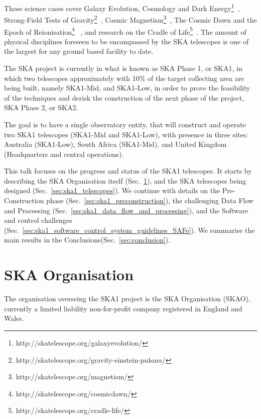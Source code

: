 \documentclass[a4paper,
               biblatex,       %
               keeplastbox,    %
               ]{jacow-2_1}    %
\begin{document}
Those science cases cover Galaxy Evolution, Cosmology and Dark Energy\footnote{http://skatelescope.org/galaxyevolution/}~\cite{2015aska.confE..67P, 2015aska.confE..16M, 2015aska.confE..51F}, Strong-Field Tests of Gravity\footnote{http://skatelescope.org/gravity-einstein-pulsars/}~\cite{2015aska.confE..36K}, Cosmic Magnetism\footnote{http://skatelescope.org/magnetism/}~\cite{2015aska.confE..92J}, The Cosmic Dawn and the Epoch of Reionisation\footnote{http://skatelescope.org/cosmicdawn/} ~\cite{2015aska.confE...1K}, and research on the Cradle of Life\footnote{http://skatelescope.org/cradle-life/}~\cite{2015aska.confE.115H}. The amount of physical disciplines foreseen to be encompassed by the SKA telescopes is one of the largest for any ground based facility to date.

The SKA project is currently in what is known as SKA Phase 1, or SKA1, in which two telescopes approximately with 10\% of the target collecting area are being built, namely SKA1-Mid, and SKA1-Low, in order to prove the feasibility of the techniques and derisk the construction of the next phase of the project, SKA Phase 2, or SKA2.

The goal is to have a single observatory entity, that will construct and operate two SKA1 telescopes (SKA1-Mid and SKA1-Low), with presence in three sites: Australia (SKA1-Low), South Africa (SKA1-Mid), and United Kingdom (Headquarters and central operations).

This talk focuses on the progress and status of the SKA1 telescopes. It starts by describing the SKA Organisation itself (Sec.~\ref{sec:ska_organisation}), and the SKA telescopes being designed (Sec.~\ref{sec:ska1_telescopes}). We continue with details on the Pre-Construction phase (Sec.~\ref{sec:ska1_preconstruction}), the challenging Data Flow and Processing (Sec.~\ref{sec:ska1_data_flow_and_processing}), and the Software and control challenges (Sec.~\ref{sec:ska1_software_control_system_guidelines_SAFe}). We summarise the main results in the Conclusions(Sec.~\ref{sec:conclusion}). 


\section{SKA Organisation} %
\label{sec:ska_organisation}
The organisation overseing the SKA1 project is the SKA Organisation (SKAO), currently a limited liability non-for-profit company registered in England and Wales.
\end{document}
